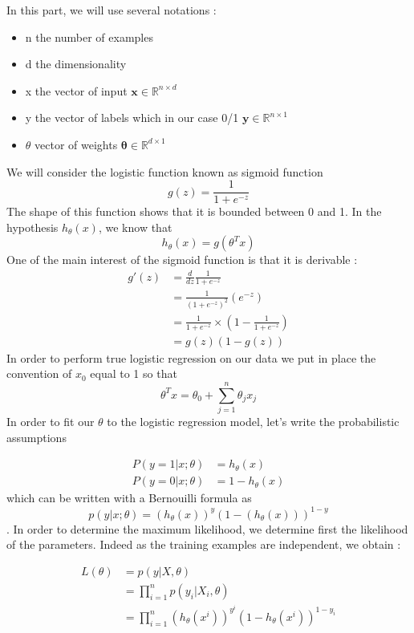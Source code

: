 \documentclass[a4paper,11pt]{article}
\begin{document}
In this part, we will use several notations : 
\begin{itemize}
\item n the number of examples
\item d the dimensionality
\item x the vector of input $\mathbf{x}\in \mathbb{R}^{n\times d}$
\item y the vector of labels which in our case 0/1  $\mathbf{y}\in \mathbb{R}^{n\times1}$
\item $\theta$ vector of weights $\mathbf{\theta}\in \mathbb{R}^{d\times1}$
\end{itemize}

We will consider the logistic function known as sigmoid function $$g(z) = \frac{1}{1 + e^{-z}}$$ The shape of this function shows that it is bounded between 0 and 1. In the hypothesis $h_{\theta}(x)$, we know that  $$h_{\theta}(x) = g(\theta^T x)$$ One of the main interest of the sigmoid function is that it is derivable :
\begin{align*}
g'(z) &= \frac{d}{dz} \frac{1}{1 + e^{-z}}\\
&= \frac{1}{(1 + e^{-z})^2} (e^{-z})\\
&= \frac{1}{1 + e^{-z}} \times (1 - \frac{1}{1 + e^{-z}})\\
&= g(z)(1-g(z))
\end{align*}
In order to perform true logistic regression on our data we put in place the convention of $x_0$ equal to 1 so that $$\theta^{T} x = \theta_{0} + \sum _{j=1}^{n} \theta_j x_j $$
In order to fit our $\theta$ to the logistic regression model, let's write the probabilistic assumptions 

\begin{align*}
P(y = 1 | x;\theta) &= h_{\theta}(x)\\
P(y = 0 | x;\theta) &= 1 - h_{\theta}(x)
\end{align*}
which can be written with a Bernouilli formula as $$p(y | x;\theta) = (h_{\theta}(x))^{y} (1-(h_{\theta}(x)))^{1-y}$$.
In order to determine the maximum likelihood, we determine first the likelihood of the parameters. Indeed as the training examples are independent, we obtain : 

\begin{align*}
L(\theta) &= p(y|X,\theta)\\
&= \prod_{i=1}^n p(y_{i} |X_{i},\theta)\\
&= \prod_{i=1}^n (h_{\theta}(x^{i}))^{y^{i}} (1 - h_{\theta}(x^{i}))^{1 - y_{i}}
\end{align*}
\end{document}
